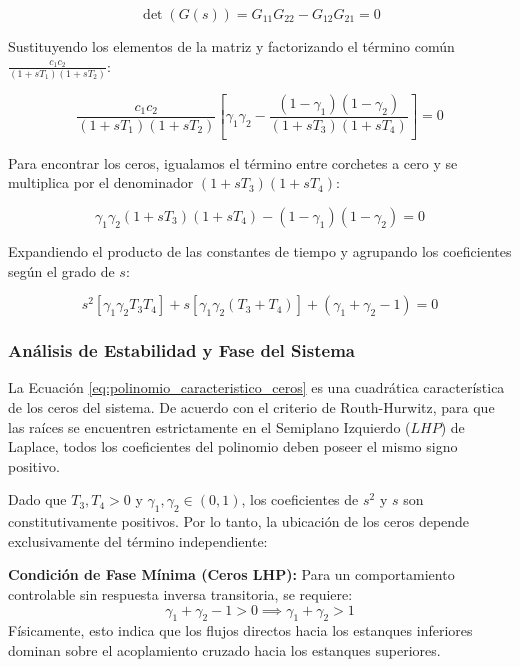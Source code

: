 \begin{equation}
\det(G(s)) = G_{11}G_{22} - G_{12}G_{21} = 0
\label{eq:det_Gs}
\end{equation}

Sustituyendo los elementos de la matriz y factorizando el término común $\frac{c_1 c_2}{(1+sT_1)(1+sT_2)}$:

\begin{equation}
\frac{c_1 c_2}{(1+sT_1)(1+sT_2)} \left[ \gamma_1 \gamma_2 - \frac{(1-\gamma_1)(1-\gamma_2)}{(1+sT_3)(1+sT_4)} \right] = 0
\label{eq:ceros_factorizado}
\end{equation}

Para encontrar los ceros, igualamos el término entre corchetes a cero y se multiplica por el denominador $(1+sT_3)(1+sT_4)$:

\begin{equation}
\gamma_1 \gamma_2 (1+sT_3)(1+sT_4) - (1-\gamma_1)(1-\gamma_2) = 0
\label{eq:ecuacion_ceros}
\end{equation}

Expandiendo el producto de las constantes de tiempo y agrupando los coeficientes según el grado de $s$:

\begin{equation}
s^2 [\gamma_1 \gamma_2 T_3 T_4] + s [\gamma_1 \gamma_2 (T_3+T_4)] + (\gamma_1 + \gamma_2 - 1) = 0
\label{eq:polinomio_caracteristico_ceros}
\end{equation}
\clearpage
\subsubsection{Análisis de Estabilidad y Fase del Sistema}
La Ecuación \eqref{eq:polinomio_caracteristico_ceros} es una cuadrática característica de los ceros del sistema. De acuerdo con el criterio de Routh-Hurwitz, para que las raíces se encuentren estrictamente en el Semiplano Izquierdo ($LHP$) de Laplace, todos los coeficientes del polinomio deben poseer el mismo signo positivo.

Dado que $T_3, T_4 > 0$ y $\gamma_1, \gamma_2 \in (0, 1)$, los coeficientes de $s^2$ y $s$ son constitutivamente positivos. Por lo tanto, la ubicación de los ceros depende exclusivamente del término independiente:

\textbf{Condición de Fase Mínima (Ceros LHP):}
Para un comportamiento controlable sin respuesta inversa transitoria, se requiere:
\begin{equation}
\gamma_1 + \gamma_2 - 1 > 0 \implies \gamma_1 + \gamma_2 > 1
\label{eq:condicion_fase_minima}
\end{equation}
Físicamente, esto indica que los flujos directos hacia los estanques inferiores dominan sobre el acoplamiento cruzado hacia los estanques superiores.


